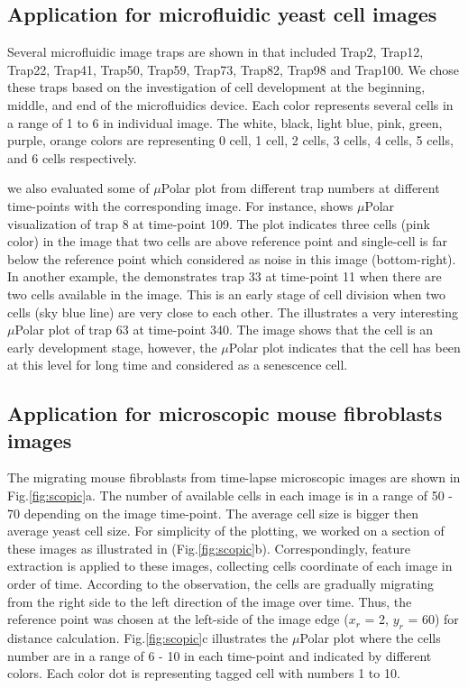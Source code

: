 \documentclass[conference]{IEEEtran}
\begin{document}

\subsection{Application for  microfluidic yeast cell images}
Several microfluidic image traps are shown in  that included Trap2, Trap12, Trap22, Trap41, Trap50, Trap59, Trap73, Trap82, Trap98 and Trap100. We chose these traps based on the investigation of cell development at the beginning, middle, and end of the microfluidics device. Each color represents several cells in a range of 1 to 6 in individual image. The white, black, light blue, pink, green, purple, orange colors are representing 0 cell, 1 cell, 2 cells, 3 cells, 4 cells, 5 cells, and 6 cells respectively.

we also evaluated some of $\mu$Polar plot from different trap numbers at different time-points with the corresponding image. For instance,  shows $\mu$Polar visualization of trap 8 at time-point 109. The plot indicates three cells (pink color) in the image that two cells are above reference point and single-cell is far below the reference point which considered as noise in this image (bottom-right). In another example, the  demonstrates trap 33 at time-point 11 when there are two cells available in the image. This is an early stage of cell division when two cells (sky blue line) are very close to each other.  The  illustrates a very interesting $\mu$Polar plot of trap 63 at time-point 340. The image shows that the cell is an early development stage, however, the $\mu$Polar plot indicates that the cell has been at this level for long time and considered as a senescence cell. 


\subsection{ Application for microscopic mouse fibroblasts images}
 The migrating mouse fibroblasts from time-lapse microscopic images are  shown in Fig.\ref{fig:scopic}a. The number of available cells in each image is in a range of 50 - 70 depending on the image time-point. The average cell size is bigger then average yeast cell size. For simplicity of the plotting, we worked on a section of these images as illustrated in (Fig.\ref{fig:scopic}b). Correspondingly, feature extraction is applied to these images, collecting cells coordinate of each image in order of time. According to the observation, the cells are gradually migrating from the right side to the left direction of the image over time. Thus, the reference point was chosen at the left-side of the image edge ($x_r$ = 2, $y_r$ = 60) for distance calculation. Fig.\ref{fig:scopic}c illustrates the $\mu$Polar plot where the cells number are in a range of 6 - 10 in each time-point and indicated by different colors. Each color dot is representing  tagged cell with numbers 1 to 10.  
\end{document}
